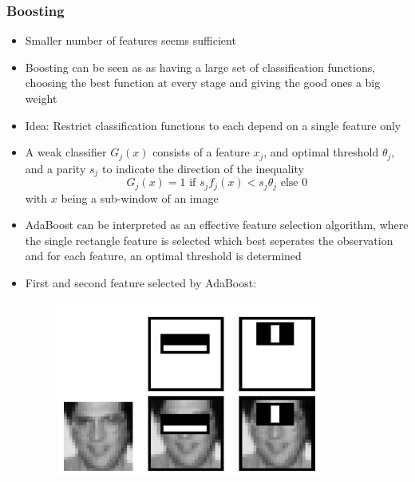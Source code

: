 \subsubsection*{Boosting}
\begin{itemize}
    \item
        Smaller number of features seems sufficient
    \item
        Boosting can be seen as as having a large set of classification functions, choosing the best function at every stage and giving the good ones a big weight
    \item
        Idea: Restrict classification functions to each depend on a single feature only
    \item
        A weak classifier $G_j(x)$ consists of a feature $x_j$, and optimal threshold $\theta_j$, and a parity $s_j$ to indicate the direction of the inequality
        $$G_j(x) = 1 \text{ if } s_j f_j(x) < s_j \theta_j \text{ else } 0$$
        with $x$ being a sub-window of an image
    \item
        AdaBoost can be interpreted as an effective feature selection algorithm, where the single rectangle feature is selected which best seperates the observation and for each feature, an optimal threshold is determined
    \item
        First and second feature selected by AdaBoost:

        \begin{figure}[H]
            \centering
            \includegraphics[scale=0.7]{figures/viola2}
        \end{figure}
\end{itemize}
